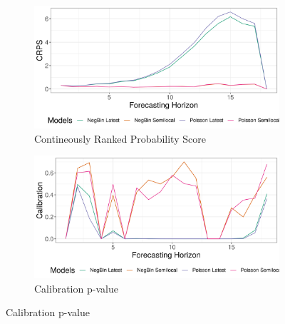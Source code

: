 \begin{figure}[H]
\begin{subfigure}{0.5\textwidth}
  \centering
  \includegraphics[width=\linewidth]{../output/Mwenga_crps.png}  
  \caption{Contineously Ranked Probability Score}
  \label{fig:sub-first}
\end{subfigure}
\begin{subfigure}{0.5\textwidth}
  \centering
  \includegraphics[width=\linewidth]{../output/Mwenga_calibration.png}  
  \caption{Calibration p-value}
  \label{fig:sub-second}
\end{subfigure}


\end{figure}
